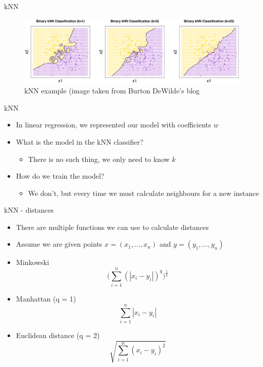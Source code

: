 \documentclass[aspectratio=169]{beamer}
\begin{document}
\begin{frame}{kNN}
    \begin{center}
        \begin{figure}
            \includegraphics[scale=0.27]{./images/knn02.png}
        \caption{kNN example (image taken from Burton DeWilde's blog}
        \end{figure}
    \end{center}
\end{frame}
\begin{frame}{kNN}
    \begin{itemize}[<+->]
        \item In linear regression, we represented our model with coefficients $w$
        \item What is the  model in the kNN classifier?
            \begin{itemize}
                \item There is no such thing, we only need to know $k$
            \end{itemize}
        \item How do we train the model?
            \begin{itemize}
                \item We don't, but every time we must calculate neighbours for a new instance
            \end{itemize}
    \end{itemize}
\end{frame}
\begin{frame}{kNN - distances}
    \begin{itemize}
        \item There are multiple functions we can use to calculate distances
        \item Assume we are given points $x = (x_1, ..., x_n)$ and $y = (y_1, ..., y_n)$
        \item Minkowski
            $$ \bigg( {\sum_{i=1}^{n} (|x_i - y_i|)^q} \bigg)^\frac{1}{q} $$
        \item Manhattan (q = 1)
            $$ \sum_{i=1}^{n} \left| x_i - y_i \right| $$
        \item Euclidean distance (q = 2)
            $$ \sqrt{\sum_{i=1}^{n} (x_i - y_i)^2} $$
    \end{itemize}
\end{frame}
\end{document}
